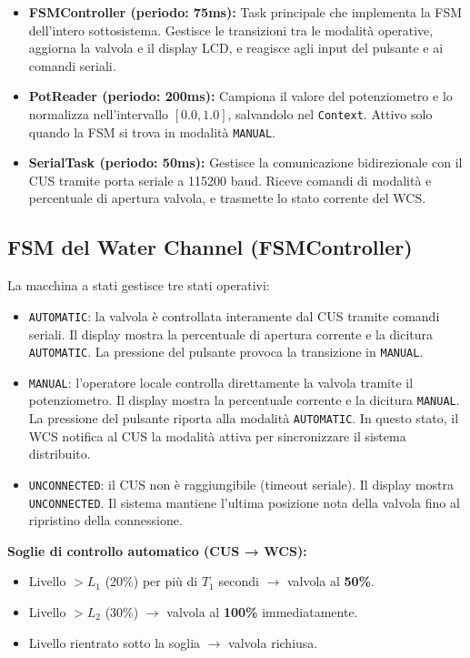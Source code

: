 \documentclass[12pt, a4paper]{article}
\begin{document}
\begin{itemize}
    \item \textbf{FSMController (periodo: 75ms):} Task principale che implementa la FSM dell'intero sottosistema. Gestisce le transizioni tra le modalità operative, aggiorna la valvola e il display LCD, e reagisce agli input del pulsante e ai comandi seriali.

    \item \textbf{PotReader (periodo: 200ms):} Campiona il valore del potenziometro e lo normalizza nell'intervallo $[0.0, 1.0]$, salvandolo nel \texttt{Context}. Attivo solo quando la FSM si trova in modalità \texttt{MANUAL}.

    \item \textbf{SerialTask (periodo: 50ms):} Gestisce la comunicazione bidirezionale con il CUS tramite porta seriale a 115200 baud. Riceve comandi di modalità e percentuale di apertura valvola, e trasmette lo stato corrente del WCS.
\end{itemize}

\subsection{FSM del Water Channel (FSMController)}

La macchina a stati gestisce tre stati operativi:

\begin{itemize}
    \item \texttt{AUTOMATIC}: la valvola è controllata interamente dal CUS tramite comandi seriali. Il display mostra la percentuale di apertura corrente e la dicitura \texttt{AUTOMATIC}. La pressione del pulsante provoca la transizione in \texttt{MANUAL}.

    \item \texttt{MANUAL}: l'operatore locale controlla direttamente la valvola tramite il potenziometro. Il display mostra la percentuale corrente e la dicitura \texttt{MANUAL}. La pressione del pulsante riporta alla modalità \texttt{AUTOMATIC}. In questo stato, il WCS notifica al CUS la modalità attiva per sincronizzare il sistema distribuito.

    \item \texttt{UNCONNECTED}: il CUS non è raggiungibile (timeout seriale). Il display mostra \texttt{UNCONNECTED}. Il sistema mantiene l'ultima posizione nota della valvola fino al ripristino della connessione.
\end{itemize}

\textbf{Soglie di controllo automatico (CUS → WCS):}
\begin{itemize}
    \item Livello $> L_1$ (20\%) per più di $T_1$ secondi $\rightarrow$ valvola al \textbf{50\%}.
    \item Livello $> L_2$ (30\%) $\rightarrow$ valvola al \textbf{100\%} immediatamente.
    \item Livello rientrato sotto la soglia $\rightarrow$ valvola richiusa.
\end{itemize}
\end{document}
